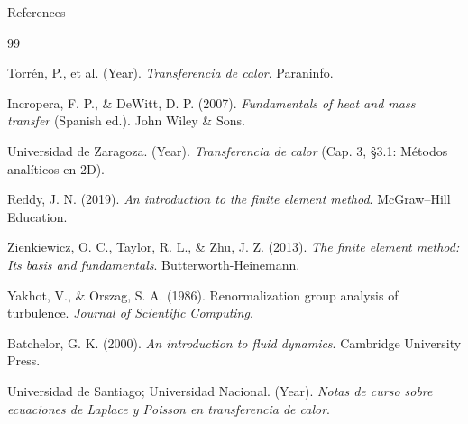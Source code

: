 \documentclass{beamer}
\begin{document}
\begin{frame}{References}
    \footnotesize
    
    \begin{thebibliography}{99}
    
    \bibitem{}
    Torrén, P., et al. (Year). \textit{Transferencia de calor}. Paraninfo.
    
    \bibitem{}
    Incropera, F. P., \& DeWitt, D. P. (2007). 
    \textit{Fundamentals of heat and mass transfer} (Spanish ed.). 
    John Wiley \& Sons.
    
    \bibitem{}
    Universidad de Zaragoza. (Year). 
    \textit{Transferencia de calor} (Cap. 3, §3.1: Métodos analíticos en 2D).
    
    \bibitem{}
    Reddy, J. N. (2019). 
    \textit{An introduction to the finite element method}. 
    McGraw–Hill Education.
    
    \bibitem{}
    Zienkiewicz, O. C., Taylor, R. L., \& Zhu, J. Z. (2013). 
    \textit{The finite element method: Its basis and fundamentals}. 
    Butterworth-Heinemann.
    
    \bibitem{}
    Yakhot, V., \& Orszag, S. A. (1986). 
    Renormalization group analysis of turbulence. 
    \textit{Journal of Scientific Computing}.
    
    \bibitem{}
    Batchelor, G. K. (2000). 
    \textit{An introduction to fluid dynamics}. 
    Cambridge University Press.
    
    \bibitem{}
    Universidad de Santiago; Universidad Nacional. (Year). 
    \textit{Notas de curso sobre ecuaciones de Laplace y Poisson en transferencia de calor}.
    
    \end{thebibliography}
    
    \end{frame}
\end{document}
